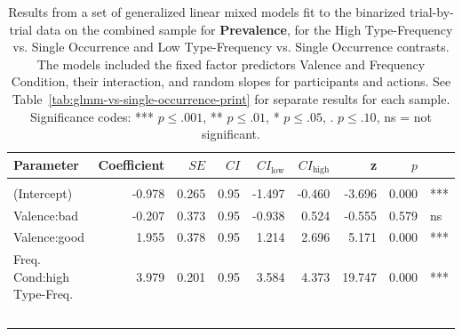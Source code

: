 \documentclass[
]{article}
\begin{document}
\begin{table}
\end{table}
\begin{table}
\centering\centering
\caption{\label{tab:glmm-vs-single-occurrence-combined-print-prevalence}Results from a set of generalized linear mixed models fit to the binarized trial-by-trial data on the combined sample for \textbf{Prevalence}, for the High Type-Frequency vs. Single Occurrence and Low Type-Frequency vs. Single Occurrence contrasts. The models included the fixed factor predictors Valence and Frequency Condition, their interaction, and random slopes for participants and actions. See Table~\ref{tab:glmm-vs-single-occurrence-print} for separate results for each sample. Significance codes: *** $p \leq .001$, ** $p \leq .01$, * $p \leq .05$, . $p \leq .10$, ns = not significant.}
\centering
\begin{tabular}[t]{lrrrrrrrl}
\toprule
Parameter & Coefficient & $\mathit{SE}$ & $C$$I$ & $CI_{\text{low}}$ & $CI_{\text{high}}$ & z & $p$ &  \\
\midrule
\addlinespace[0.3em]
\multicolumn{9}{l}{\textbf{High Type-Frequency (vs. Single Occurrence)}}\\
\hspace{1em}(Intercept) & -0.978 & 0.265 & 0.95 & -1.497 & -0.460 & -3.696 & 0.000 & ***\\
\hspace{1em}Valence:bad & -0.207 & 0.373 & 0.95 & -0.938 & 0.524 & -0.555 & 0.579 & ns\\
\hspace{1em}Valence:good & 1.955 & 0.378 & 0.95 & 1.214 & 2.696 & 5.171 & 0.000 & ***\\
Freq.
Cond:high
\hspace{1em}Type-Freq. & 3.979 & 0.201 & 0.95 & 3.584 & 4.373 & 19.747 & 0.000 & ***\\
$$
\end{tabular}
\end{table}
\end{document}
